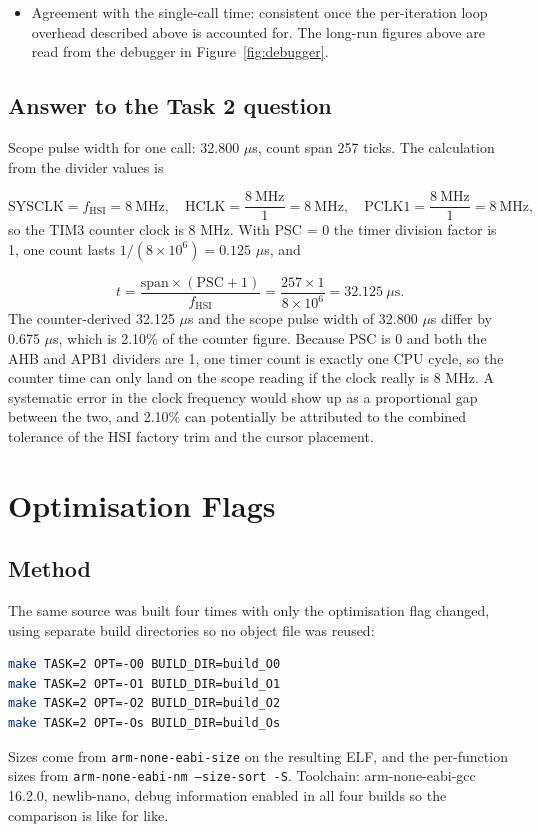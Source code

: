 \documentclass[11pt]{article}
\begin{document}
\begin{itemize}
  \item Agreement with the single-call time: consistent once the per-iteration
        loop overhead described above is accounted for. The long-run figures above are read from the debugger in
Figure~\ref{fig:debugger}.
\end{itemize}


\subsection{Answer to the Task 2 question}

Scope pulse width for one call: 32.800 $\mu$s, count span 257 ticks. The
calculation from the divider values is

\[
\text{SYSCLK} = f_{\text{HSI}} = 8~\text{MHz}, \quad
\text{HCLK} = \frac{8~\text{MHz}}{1} = 8~\text{MHz}, \quad
\text{PCLK1} = \frac{8~\text{MHz}}{1} = 8~\text{MHz},
\]
\noindent
so the TIM3 counter clock is 8 MHz. With PSC = 0 the timer division factor is 1,
one count lasts $1 / (8 \times 10^{6}) = 0.125$ $\mu$s, and

\[
t = \frac{\text{span} \times (\text{PSC}+1)}{f_{\text{HSI}}}
  = \frac{257 \times 1}{8 \times 10^{6}} = 32.125~\mu\text{s}.
\]
\noindent
The counter-derived
32.125 $\mu$s and the scope pulse width of 32.800 $\mu$s differ by 0.675 $\mu$s,
which is 2.10\% of the counter figure. Because PSC is 0 and both the AHB and
APB1 dividers are 1, one timer count is exactly one CPU cycle, so the counter
time can only land on the scope reading if the clock really is 8 MHz. A
systematic error in the clock frequency would show up as a proportional gap
between the two, and 2.10\% can potentially be attributed to the combined tolerance of the HSI factory
trim and the cursor placement.


\clearpage
\setlength{\parindent}{0pt}
\section{Optimisation Flags}

\subsection{Method}

The same source was built four times with only the optimisation flag changed,
using separate build directories so no object file was reused:

\begin{lstlisting}[language=bash]
make TASK=2 OPT=-O0 BUILD_DIR=build_O0
make TASK=2 OPT=-O1 BUILD_DIR=build_O1
make TASK=2 OPT=-O2 BUILD_DIR=build_O2
make TASK=2 OPT=-Os BUILD_DIR=build_Os
\end{lstlisting}
\noindent
Sizes come from \texttt{arm-none-eabi-size} on the resulting ELF, and the
per-function sizes from \texttt{arm-none-eabi-nm --size-sort -S}. Toolchain:
arm-none-eabi-gcc 16.2.0, newlib-nano, debug information enabled in all four
builds so the comparison is like for like.
\end{document}
